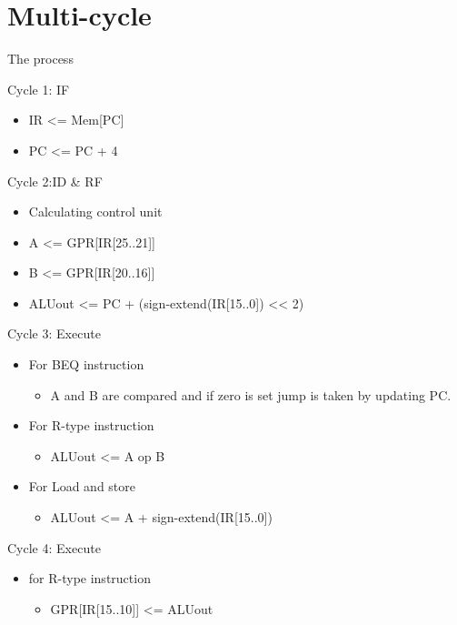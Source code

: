 \chapter{Multi-cycle}
The process
\begin{definition}
    \item [Cycle 1: IF]
    \begin{itemize}
        \item IR <= Mem[PC]
        \item PC <= PC + 4
    \end{itemize}
    \item [Cycle 2:ID \& RF]
    \begin{itemize}
        \item Calculating control unit
        \item A <= GPR[IR[25..21]]
        \item B <= GPR[IR[20..16]]
        \item ALUout <= PC + (sign-extend(IR[15..0]) << 2)
    \end{itemize}
    \item [Cycle 3: Execute]
    \begin{itemize}
        \item For BEQ instruction
              \begin{itemize}
                  \item A and B are compared and if zero is set jump is taken by updating PC.
              \end{itemize}
        \item For R-type instruction
              \begin{itemize}
                  \item ALUout <= A op B
              \end{itemize}
        \item For Load and store
              \begin{itemize}
                  \item ALUout <= A + sign-extend(IR[15..0])
              \end{itemize}
    \end{itemize}
    \item [Cycle 4: Execute]
    \begin{itemize}
        \item for R-type instruction
              \begin{itemize}
                  \item GPR[IR[15..10]] <= ALUout
              \end{itemize}

\end{itemize}
\end{definition}

